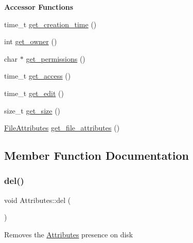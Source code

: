 \begin{Indent}\textbf{ Accessor Functions}\par
\begin{DoxyCompactItemize}
\item 
time\+\_\+t \mbox{\hyperlink{classAttributes_aeb0845464130e292875be4f8dcc51e8a}{get\+\_\+creation\+\_\+time}} ()
\item 
int \mbox{\hyperlink{classAttributes_a8b9efe0186ccf74b4b08c4031a99f5bb}{get\+\_\+owner}} ()
\item 
char $\ast$ \mbox{\hyperlink{classAttributes_a52a8dc1b5d9c4c1eb19bcb336705cc42}{get\+\_\+permissions}} ()
\item 
time\+\_\+t \mbox{\hyperlink{classAttributes_a9cd0c49733d3de43a8916a318ba62bc1}{get\+\_\+access}} ()
\item 
time\+\_\+t \mbox{\hyperlink{classAttributes_a4ff80c2f3a31f86d874d7982354e4f70}{get\+\_\+edit}} ()
\item 
size\+\_\+t \mbox{\hyperlink{classAttributes_a6e5df8252fc902c0fbe22058fe0b4fb1}{get\+\_\+size}} ()
\item 
\mbox{\hyperlink{structfile__attributes}{File\+Attributes}} \mbox{\hyperlink{classAttributes_a774666651c1d61cade39cc15cf03b9b2}{get\+\_\+file\+\_\+attributes}} ()
\end{DoxyCompactItemize}
\end{Indent}


\subsection{Member Function Documentation}
\mbox{\label{classAttributes_acf28e724c914f066ecdae788d95b3212}} 
\subsubsection{\texorpdfstring{del()}{del()}}
{\footnotesize\ttfamily void Attributes\+::del (\begin{DoxyParamCaption}{ }\end{DoxyParamCaption})}

Removes the \mbox{\hyperlink{classAttributes}{Attributes}} presence on disk \mbox{\label{classAttributes_a9cd0c49733d3de43a8916a318ba62bc1}} 
